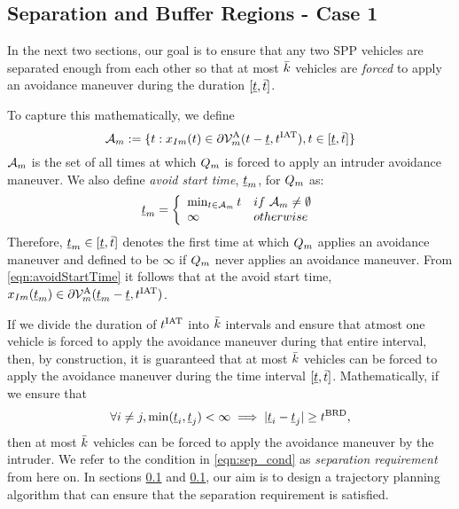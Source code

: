 \subsection{Separation and Buffer Regions - Case 1} \label{sec:case1}
In the next two sections, our goal is to ensure that any two SPP vehicles are separated enough from each other so that %
at most $\bar{k}$ vehicles are \textit{forced} to apply an avoidance maneuver during the duration $[\underline{t}, \bar{t}]$.  

To capture this mathematically, we define 
\begin{equation} \label{eqn:avoidStartTime}
\avoidt_{m} := \{t: \state_{\intr m}(t) \in \partial\brs^{\text{A}}_{m}(t-\tsa, \iat), t \in [\tsa, \tea]\}
\end{equation} 
$\mathcal{A}_{m}$ is the set of all times at which $Q_m$ is forced to apply an intruder avoidance maneuver. We also define \textit{avoid start time}, $\underline{t}_m$, for $Q_m$ as:
\begin{equation} \label{eqn:avoidStartTime2}
\tsa_m  = 
\left \{ 
\begin{array}{ll}
\min_{t \in  \avoidt_{m}} t & \mbox{if~} \avoidt_{m} \neq \emptyset\\
\infty & \mbox{otherwise}
\end{array}
\right.
\end{equation}  
Therefore, $\underline{t}_m \in [\underline{t}, \bar{t}]$ denotes the first time at which $Q_m$ applies an avoidance maneuver and defined to be $\infty$ if $Q_m$ never applies an avoidance maneuver. From \eqref{eqn:avoidStartTime} it follows that at the avoid start time, $x_{I m}(\underline{t}_m) \in  \partial\mathcal{V}^{\text{A}}_{m}(\underline{t}_m-\underline{t}, t^\text{IAT})$. %
 
If we divide the duration of $t^\text{IAT}$ into $\bar{k}$ intervals and ensure that atmost one vehicle is forced to apply the avoidance maneuver during that entire interval, then, by construction, it is guaranteed that at most $\bar{k}$ vehicles can be forced to apply the avoidance maneuver during the time interval $[\underline{t}, \bar{t}]$. Mathematically, if we ensure that 
\begin{equation} \label{eqn:sep_cond}
\forall i \neq j, \min(\tsa_i, \tsa_j)< \infty \implies |\tsa_i - \tsa_j| \geq \brd,
\end{equation}
then at most $\bar{k}$ vehicles can be forced to apply the avoidance maneuver by the intruder. We refer to the condition in \eqref{eqn:sep_cond} as \textit{separation requirement} from here on. In sections \ref{sec:case1} and \ref{sec:case1}, our aim is to design a trajectory planning algorithm that can ensure that the separation requirement is satisfied.   

